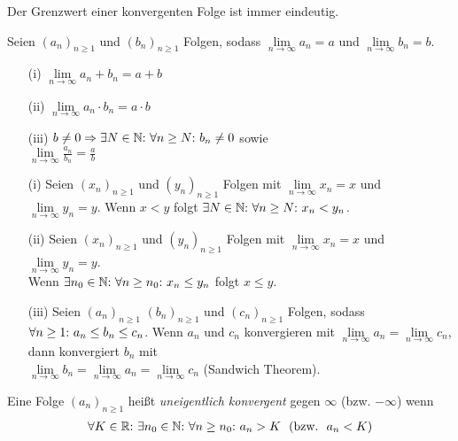 \begin{framedthm}
	Der Grenzwert einer konvergenten Folge ist immer eindeutig.
\end{framedthm}

\begin{framedthm}
	Seien $(a_n)_{n\geq 1}$ und $(b_n)_{n\geq 1}$ Folgen, sodass $\lim\limits_{n \to \infty} a_n = a$ und $\lim\limits_{n \to \infty} b_n = b$.
	\begin{enumerate}
		\item[(i)]  $\lim\limits_{n \to \infty} a_n + b_n = a + b$
		\item[(ii)]  $\lim\limits_{n \to \infty} a_n \cdot b_n = a \cdot b$
		\item[(iii)] $b \neq 0 \Rightarrow \exists N \in \mathbb{N}{:}\  \forall n \geq N{:}\  b_n \neq 0$ sowie \\
		$\lim\limits_{n \to \infty} \frac{a_n}{b_n} = \frac{a}{b}$ 
	\end{enumerate}
	
\end{framedthm}

\begin{framedthm}
	\begin{enumerate}
		\item[(i)] Seien $(x_n)_{n\geq 1}$ und $(y_n)_{n\geq 1}$ Folgen mit $\lim\limits_{n \to \infty} x_n = x$ und $\lim\limits_{n \to \infty} y_n = y$. Wenn $x < y$ folgt $\exists N \in \mathbb{N}{:}\  \forall n \geq N{:}\  x_n < y_n$.
		\item[(ii)] Seien $(x_n)_{n\geq 1}$ und $(y_n)_{n\geq 1}$ Folgen mit $\lim\limits_{n \to \infty} x_n = x$ und $\lim\limits_{n \to \infty} y_n = y$.\\Wenn $\exists n_0 \in \mathbb{N}{:}\ \forall n \geq n_0{:}\  x_n \leq y_n$ folgt $x \leq y$.
		\item[(iii)] Seien $(a_n)_{n\geq 1}$ $(b_n)_{n\geq 1}$ und $(c_n)_{n\geq 1}$ Folgen, sodass $\forall n\geq 1{:}\  a_n \leq b_n \leq c_n$. Wenn $a_n$ und $c_n$ konvergieren mit $\lim\limits_{n \to \infty} a_n = \lim\limits_{n \to \infty} c_n$, dann konvergiert $b_n$ mit\\$\lim\limits_{n \to \infty} b_n = \lim\limits_{n \to \infty} a_n = \lim\limits_{n \to \infty} c_n$ (Sandwich Theorem).
	\end{enumerate}
\end{framedthm}

\begin{frameddefn}
	Eine Folge $(a_n)_{n\geq 1}$ heißt \textit{uneigentlich konvergent} gegen $\infty$ (bzw. $-\infty$) wenn 
	\begin{align*}
		\forall K \in \mathbb{R}{:}\  \exists n_0 \in \mathbb{N}{:}\  \forall n \geq n_0{:}\  a_n > K\ \ \textrm{(bzw.}\ \  a_n < K\textrm{)}
	\end{align*}
	
\end{frameddefn}



